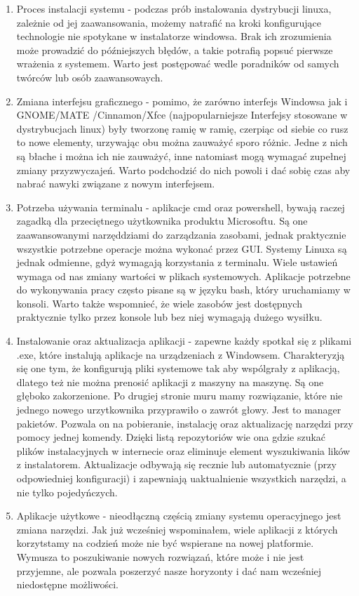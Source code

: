 \documentclass[10pt,a4paper]{report}
\begin{document}
\begin{enumerate}
\item Proces instalacji systemu - podczas prób instalowania dystrybucji linuxa, zależnie od jej zaawansowania, możemy natrafić na kroki konfigurujące technologie nie spotykane w instalatorze windowsa. Brak ich zrozumienia może prowadzić do późniejszych błędów, a takie potrafią popsuć pierwsze wrażenia z systemem. Warto jest postępować wedle poradników od samych twórców lub osób zaawansowaych.
\item Zmiana interfejsu graficznego - pomimo, że zarówno interfejs Windowsa jak i GNOME/MATE /Cinnamon/Xfce (najpopularniejsze Interfejsy stosowane w dystrybucjach linux) były tworzonę ramię w ramię, czerpiąc od siebie co rusz to nowe elementy, urzywając obu można zauważyć sporo różnic. Jedne z nich są błache i można ich nie zauważyć, inne natomiast mogą wymagać zupełnej zmiany przyzwyczajeń. Warto podchodzić do nich powoli i dać sobię czas aby nabrać nawyki związane z nowym interfejsem.
\item Potrzeba używania terminalu - aplikacje cmd oraz powershell, bywają raczej zagadką dla przeciętnego użytkownika produktu Microsoftu. Są one zaawansowanymi narzęddziami do zarządzania zasobami, jednak praktycznie wszystkie potrzebne operacje można wykonać przez GUI. Systemy Linuxa są jednak odmienne, gdyż wymagają korzystania z terminalu. Wiele ustawień wymaga od nas zmiany wartości w plikach systemowych. Aplikacje potrzebne do wykonywania pracy często pisane są w języku bash, który uruchamiamy w konsoli. Warto także wspomnieć, że wiele zasobów jest dostępnych praktycznie tylko przez konsole lub bez niej wymagają dużego wysiłku.
\item Instalowanie oraz aktualizacja aplikacji - zapewne każdy spotkał się z plikami .exe, które instalują aplikacje na urządzeniach z Windowsem. Charakteryzją się one tym, że konfigurują pliki systemowe tak aby wspólgrały z aplikacją, dlatego też nie można prenosić aplikacji z maszyny na maszynę. Są one głęboko zakorzenione. Po drugiej stronie muru mamy rozwiązanie, które nie jednego nowego urzytkownika przyprawiło o zawrót głowy. Jest to manager pakietów. Pozwala on na pobieranie, instalację oraz aktualizację narzędzi przy pomocy jednej komendy. Dzięki listą repozytoriów wie ona gdzie szukać plików instalacyjnych w internecie oraz eliminuje element wyszukiwania lików z instalatorem. Aktualizacje odbywają się recznie lub automatycznie (przy odpowiedniej konfiguracji) i zapewniają uaktualnienie wszystkich narzędzi, a nie tylko pojedyńczych.
\item Aplikacje użytkowe - nieodłączną częścią zmiany systemu operacyjnego jest zmiana narzędzi. Jak już wcześniej wspominałem, wiele aplikacji z których korzytstamy na codzień może nie być wspierane na nowej platformie. Wymusza to poszukiwanie nowych rozwiązań, które może i nie jest przyjemne, ale pozwala poszerzyć nasze horyzonty i dać nam wcześniej niedostępne możliwości.
\end{enumerate}
	
\end{document}
